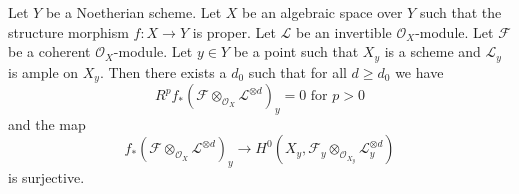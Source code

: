 %
\begin{lemma}
\label{lemma-ample-on-fibre}
Let $Y$ be a Noetherian scheme. Let $X$ be an algebraic space over $Y$
such that the structure morphism $f : X \to Y$ is proper.
Let $\mathcal{L}$ be an invertible $\mathcal{O}_X$-module.
Let $\mathcal{F}$ be a coherent $\mathcal{O}_X$-module.
Let $y \in Y$ be a point such that $X_y$ is a scheme and
$\mathcal{L}_y$ is ample on $X_y$.
Then there exists a $d_0$ such that for all $d \geq d_0$ we have
$$
R^pf_*(\mathcal{F} \otimes_{\mathcal{O}_X} \mathcal{L}^{\otimes d})_y = 0
\text{ for }p > 0
$$
and the map
$$
f_*(\mathcal{F} \otimes_{\mathcal{O}_X} \mathcal{L}^{\otimes d})_y
\longrightarrow
H^0(X_y, \mathcal{F}_y \otimes_{\mathcal{O}_{X_y}} \mathcal{L}_y^{\otimes d})
$$
is surjective.
\end{lemma}

